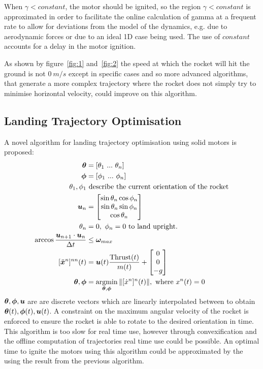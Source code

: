 When $\gamma < constant$, the motor should be ignited, so the region $\gamma < constant$ is approximated in order to facilitate the online calculation of gamma at a frequent rate to allow for deviations from the model of the dynamics, e.g. due to aerodynamic forces or due to an ideal 1D case being used.
The use of $constant$ accounts for a delay in the motor ignition.

As shown by figure~\ref{fig:1} and~\ref{fig:2} the speed at which the rocket will hit the ground is not $0\ m/s$ except in specific cases and so more advanced algorithms, that generate a more complex trajectory where the rocket does not simply try to minimise horizontal velocity, could improve on this algorithm.

\subsection{Landing Trajectory Optimisation} 
\label{subsec:TrajectoryOptimisation}

A novel algorithm for landing trajectory optimisation using solid motors is proposed:
\begin{align}
    \m \theta &= [\theta_1 \ ... \ \theta_n] \\
    \m \phi &= [\phi_1 \ ... \ \phi_n] \\
    \theta_1, \phi_1 &\text{ describe the current orientation of the rocket} \\
    \m u_n &= \begin{bmatrix}
        \sin \theta_n \cos \phi_n \\
        \sin \theta_n \sin \phi_n \\
        \cos \theta_n
    \end{bmatrix} \\
    \theta_n &= 0,\ \phi_n = 0 \text{ to land upright.} \\
    \arccos \frac{\m u_{n+1} \cdot \m u_n}{\Delta t} &\leq \m \omega_{max}\\
    [\ddot{\m x}^n]^{nn}(t) &= \m u(t) \frac{\mathrm{Thrust}(t)}{m(t)} + \begin{bmatrix}
        0 \\
        0 \\
        -g
    \end{bmatrix} \\
    \m \theta, \m \phi &= \argmin_{\m \theta, \m\phi} \norm{ [\dot{x}^n]^n(t) }, \text{ where } x^n(t) = 0
\end{align}
$\bm \theta, \bm \phi, \bm u$ are are discrete vectors which are linearly interpolated between to obtain $\bm \theta(t), \bm \phi(t), \bm u(t)$.
A constraint on the maximum angular velocity of the rocket is enforced to ensure the rocket is able to rotate to the desired orientation in time.
This algorithm is too slow for real time use, however through convexification and the offline computation of trajectories real time use could be possible.
An optimal time to ignite the motors using this algorithm could be approximated by the using the result from the previous algorithm.


